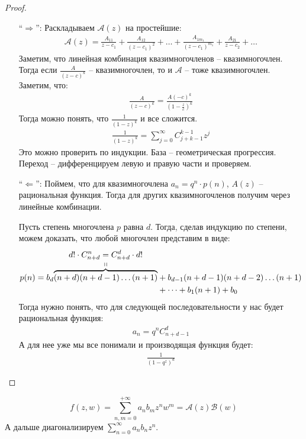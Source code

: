 \begin{proof} \quad 

    \begin{itemize}
        \item[``$\Longrightarrow$'':] Раскладываем $\mathscr A(z)$ на простейшие:
        \begin{gather*}
            \mathscr A (z) = \frac{A_{11}}{z - c_1} + \frac{A_{12}}{(z - c_1)^2} + \dots + \frac{A_{1m_1}}{(z - c_1)^{m_1}} + \frac{A_{21}}{z - c_2} + \dots    
        \end{gather*}
        Заметим, что линейная комбинация квазимногочленов -- квазимногочлен. Тогда если $\frac{A}{(z - c)^k}$ -- квазимногочлен, то и $\mathscr A$ -- тоже квазимногочлен. 
        Заметим, что: 
        \begin{gather*}
            \frac{A}{(z - c)^k} = \frac{A (-c)^k}{(1 - \frac{z}{c})^k}
        \end{gather*}
        Тогда можно понять, что $\frac{1}{(1 - z)^k}$ и все сложится. 
        \begin{gather*}
            \frac{1}{(1 - z)^k} = \sum\limits_{j=0}^{\infty} C_{j+k-1}^{k-1} z^j
        \end{gather*}
        Это можно проверить по индукции. База -- геометрическая прогрессия. Переход -- дифференцируем левую и правую части и проверяем. 
        \item[``$\Longleftarrow$'':] Поймем, что для квазимногочлена $a_n = q^n \cdot p(n)$, $A(z)$ -- рациональная функция. Тогда для других квазимногочленов получим через линейные комбинации. 
        
        Пусть степень многочлена $p$ равна $d$. Тогда, сделав индукцию по степени, можем доказать, что любой многочлен представим в виде: 
        \begin{align*}
            p(n) = b_d \stackabove{\overbrace{(n+d)(n+d-1) \dots (n+1)}}{d! \cdot C_{n+d}^{n} = C_{n+d}^{d} \cdot d!} &+ b_{d-1}(n+d-1)(n+d-2)\dots (n+1) \\ 
            &+ \dots + b_1(n+1) + b_0
        \end{align*}
        Тогда нужно понять, что для следующей последовательности у нас будет рациональная функция:
        \begin{gather*}
            a_n = q^n C_{n+d-1}^{d}
        \end{gather*}
        А для нее уже мы все понимали и производящая функция будет: 
        \begin{gather*}
            \frac{1}{(1 - q^z)^d}
        \end{gather*}
    \end{itemize}
\end{proof}

\example 
\[
    f(z, w) = \sum\limits_{n, m = 0}^{+\infty} a_nb_mz^nw^m
    = \mathscr A(z) \mathscr B(w)
\]
А дальше диагонализируем $\sum\limits_{n=0}^\infty a_n b_n z^n$. 
\newpage

